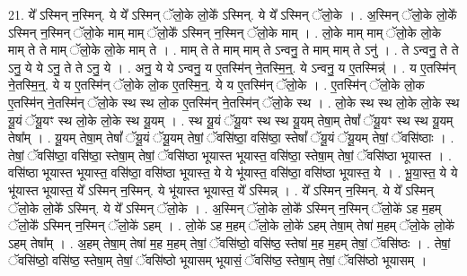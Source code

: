 \documentclass[17pt]{extarticle}
\begin{document}
21. ये᳚ ऽस्मिन् न॒स्मिन्. ये ये᳚ ऽस्मिन् ॅलो॒के लो॒के᳚ ऽस्मिन्. ये ये᳚ ऽस्मिन् ॅलो॒के । . अ॒स्मिन् ॅलो॒के लो॒के᳚ ऽस्मिन् न॒स्मिन् ॅलो॒के माम् माम् ॅलो॒के᳚ ऽस्मिन् न॒स्मिन् ॅलो॒के माम् । . लो॒के माम् माम् ॅलो॒के लो॒के माम् ते ते माम् ॅलो॒के लो॒के माम् ते । . माम् ते ते माम् माम् ते ऽन्वनु॒ ते माम् माम् ते ऽनु॑ । . ते ऽन्वनु॒ ते ते ऽनु॒ ये ये ऽनु॒ ते ते ऽनु॒ ये । . अनु॒ ये ये ऽन्वनु॒ य ए॒तस्मि॑न् ने॒तस्मि॒न्॒. ये ऽन्वनु॒ य ए॒तस्मिन्न्॑ । . य ए॒तस्मि॑न् ने॒तस्मि॒न्॒. ये य ए॒तस्मि॑न् ॅलो॒के लो॒क ए॒तस्मि॒न्॒. ये य ए॒तस्मि॑न् ॅलो॒के । . ए॒तस्मि॑न् ॅलो॒के लो॒क ए॒तस्मि॑न् ने॒तस्मि॑न् ॅलो॒के स्थ स्थ लो॒क ए॒तस्मि॑न् ने॒तस्मि॑न् ॅलो॒के स्थ । . लो॒के स्थ स्थ लो॒के लो॒के स्थ यू॒यं ॅयू॒यꣳ स्थ लो॒के लो॒के स्थ यू॒यम् । . स्थ यू॒यं ॅयू॒यꣳ स्थ स्थ यू॒यम् तेषा॒म् तेषां᳚ ॅयू॒यꣳ स्थ स्थ यू॒यम् तेषा᳚म् । . यू॒यम् तेषा॒म् तेषां᳚ ॅयू॒यं ॅयू॒यम् तेषां॒ ॅवसि॑ष्ठा॒ वसि॑ष्ठा॒ स्तेषां᳚ ॅयू॒यं ॅयू॒यम् तेषां॒ ॅवसि॑ष्ठाः । . तेषां॒ ॅवसि॑ष्ठा॒ वसि॑ष्ठा॒ स्तेषा॒म् तेषां॒ ॅवसि॑ष्ठा भूयास्त भूयास्त॒ वसि॑ष्ठा॒ स्तेषा॒म् तेषां॒ ॅवसि॑ष्ठा भूयास्त । . वसि॑ष्ठा भूयास्त भूयास्त॒ वसि॑ष्ठा॒ वसि॑ष्ठा भूयास्त॒ ये ये भू॑यास्त॒ वसि॑ष्ठा॒ वसि॑ष्ठा भूयास्त॒ ये । . भू॒या॒स्त॒ ये ये भू॑यास्त भूयास्त॒ ये᳚ ऽस्मिन् न॒स्मिन्. ये भू॑यास्त भूयास्त॒ ये᳚ ऽस्मिन्न् । . ये᳚ ऽस्मिन् न॒स्मिन्. ये ये᳚ ऽस्मिन् ॅलो॒के लो॒के᳚ ऽस्मिन्. ये ये᳚ ऽस्मिन् ॅलो॒के । . अ॒स्मिन् ॅलो॒के लो॒के᳚ ऽस्मिन् न॒स्मिन् ॅलो॒के॑ ऽह म॒हम् ॅलो॒के᳚ ऽस्मिन् न॒स्मिन् ॅलो॒के॑ ऽहम् । . लो॒के॑ ऽह म॒हम् ॅलो॒के लो॒के॑ ऽहम् तेषा॒म् तेषा॑ म॒हम् ॅलो॒के लो॒के॑ ऽहम् तेषा᳚म् । . अ॒हम् तेषा॒म् तेषा॑ म॒ह म॒हम् तेषां॒ ॅवसि॑ष्ठो॒ वसि॑ष्ठ॒ स्तेषा॑ म॒ह म॒हम् तेषां॒ ॅवसि॑ष्ठः । . तेषां॒ ॅवसि॑ष्ठो॒ वसि॑ष्ठ॒ स्तेषा॒म् तेषां॒ ॅवसि॑ष्ठो भूयासम् भूयासं॒ ॅवसि॑ष्ठ॒ स्तेषा॒म् तेषां॒ ॅवसि॑ष्ठो भूयासम् । \newline
\end{document}
